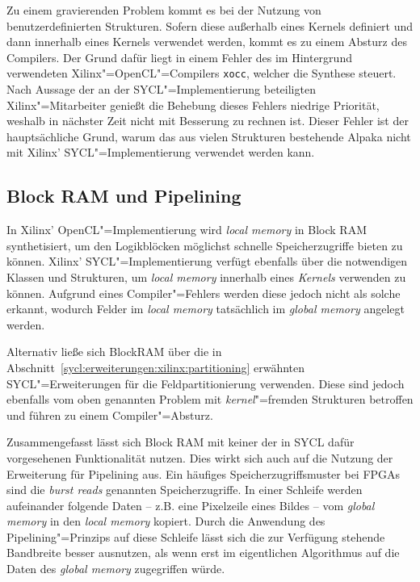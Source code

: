 Zu einem gravierenden Problem kommt es bei der Nutzung von benutzerdefinierten
Strukturen. Sofern diese außerhalb eines Kernels definiert und dann innerhalb
eines Kernels verwendet werden, kommt es zu einem Absturz des Compilers. Der
Grund dafür liegt in einem Fehler des im Hintergrund verwendeten
Xilinx"=OpenCL"=Compilers \texttt{xocc}, welcher die Synthese steuert. Nach
Aussage der an der SYCL"=Implementierung beteiligten Xilinx"=Mitarbeiter genießt
die Behebung dieses Fehlers niedrige Priorität, weshalb in nächster Zeit nicht
mit Besserung zu rechnen ist. Dieser Fehler ist der hauptsächliche Grund, warum
das aus vielen Strukturen bestehende Alpaka nicht mit Xilinx'
SYCL"=Implementierung verwendet werden kann.

\subsection{Block RAM und Pipelining}

In Xilinx' OpenCL"=Implementierung wird \textit{local memory} in Block RAM
synthetisiert, um den Logikblöcken möglichst schnelle Speicherzugriffe bieten zu
können. Xilinx' SYCL"=Implementierung verfügt ebenfalls über die notwendigen
Klassen und Strukturen, um \textit{local memory} innerhalb eines
\textit{Kernels} verwenden zu können. Aufgrund eines Compiler"=Fehlers werden
diese jedoch nicht als solche erkannt, wodurch Felder im \textit{local memory}
tatsächlich im \textit{global memory} angelegt werden.

Alternativ ließe sich BlockRAM über die in
Abschnitt~\ref{sycl:erweiterungen:xilinx:partitioning} erwähnten
SYCL"=Erweiterungen für die Feldpartitionierung verwenden. Diese sind jedoch
ebenfalls vom oben genannten Problem mit \textit{kernel}"=fremden Strukturen
betroffen und führen zu einem Compiler"=Absturz.

Zusammengefasst lässt sich Block RAM mit keiner der in SYCL dafür vorgesehenen
Funktionalität nutzen. Dies wirkt sich auch auf die Nutzung der Erweiterung
für Pipelining aus. Ein häufiges Speicherzugriffsmuster bei FPGAs sind die
\textit{burst reads} genannten Speicherzugriffe. In einer Schleife werden
aufeinander folgende Daten -- z.B. eine Pixelzeile eines Bildes -- vom
\textit{global memory} in den \textit{local memory} kopiert. Durch die Anwendung
des Pipelining"=Prinzips auf diese Schleife lässt sich die zur Verfügung
stehende Bandbreite besser ausnutzen, als wenn erst im eigentlichen Algorithmus
auf die Daten des \textit{global memory} zugegriffen würde.

